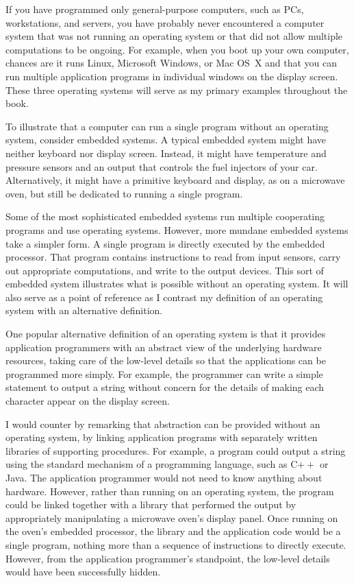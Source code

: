 If you have programmed only general-purpose computers, such as PCs,
workstations, and servers, you have probably never encountered a
computer system that was not running an operating system or that did
not allow multiple computations to be ongoing.  For example, when you
boot up your own computer, chances are it runs Linux, Microsoft
Windows, or Mac OS~X and that you can run multiple application
programs in individual windows on the display screen.  These three
operating systems will serve as my primary examples throughout the
book.

To illustrate that a computer can run a single program without an
operating system, consider embedded systems.  A typical
embedded system might have neither keyboard nor display screen.
Instead, it might have temperature and pressure sensors and an output
that controls the fuel injectors of your car.  Alternatively, it might have
a primitive keyboard and display, as on a microwave oven, but still
be dedicated to running a single program.

Some of the most sophisticated embedded systems run multiple
cooperating programs and use operating systems.  However, more
mundane embedded systems take a simpler form.  A single program is
directly executed by the embedded processor.  That program contains
instructions to read from input sensors, carry out appropriate
computations, and write to the output devices.  This sort of embedded
system illustrates what is possible without an operating system.  It
will also serve as a point of reference as I contrast my definition of an
operating system with an alternative definition.

One popular alternative definition of an operating system is that it
provides application programmers with an abstract view of the
underlying hardware resources, taking care of the low-level details so
that the applications can be programmed more simply.  For example, the
programmer can write a simple statement to output a string without
concern for the details of making each character appear on the display
screen.

I would counter by remarking that abstraction can be provided without
an operating system, by linking application programs with separately
written libraries of supporting procedures.  For example, a program
could output a string using the standard mechanism of a programming
language, such as C$++$ or Java.  The application programmer would not
need to know anything about hardware.  However, rather than running on an
operating system, the program could be linked together with a library
that performed the output by appropriately manipulating a microwave
oven's display panel.  Once running on the oven's embedded processor,
the library and the application code would be a single program,
nothing more than a sequence of instructions to directly execute.
However, from the application programmer's standpoint, the low-level
details would have been successfully hidden.


